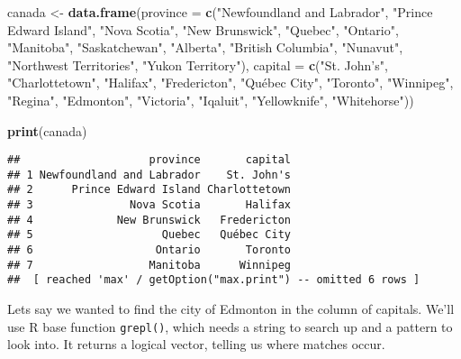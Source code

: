 \documentclass[
]{book}
\newenvironment{Shaded}{\begin{snugshade}}{\end{snugshade}}
\newcommand{\DataTypeTok}[1]{\textcolor[rgb]{0.13,0.29,0.53}{#1}}
\newcommand{\KeywordTok}[1]{\textcolor[rgb]{0.13,0.29,0.53}{\textbf{#1}}}
\newcommand{\NormalTok}[1]{#1}
\newcommand{\OperatorTok}[1]{\textcolor[rgb]{0.81,0.36,0.00}{\textbf{#1}}}
\newcommand{\StringTok}[1]{\textcolor[rgb]{0.31,0.60,0.02}{#1}}
\begin{document}
\begin{Shaded}
\begin{Highlighting}[]
\NormalTok{canada <-}\StringTok{ }\KeywordTok{data.frame}\NormalTok{(}\DataTypeTok{province =} \KeywordTok{c}\NormalTok{(}\StringTok{"Newfoundland and Labrador"}\NormalTok{, }\StringTok{"Prince Edward Island"}\NormalTok{, }\StringTok{"Nova Scotia"}\NormalTok{, }\StringTok{"New Brunswick"}\NormalTok{, }\StringTok{"Quebec"}\NormalTok{, }\StringTok{"Ontario"}\NormalTok{, }\StringTok{"Manitoba"}\NormalTok{, }\StringTok{"Saskatchewan"}\NormalTok{, }\StringTok{"Alberta"}\NormalTok{, }\StringTok{"British Columbia"}\NormalTok{, }\StringTok{"Nunavut"}\NormalTok{, }\StringTok{"Northwest Territories"}\NormalTok{, }\StringTok{"Yukon Territory"}\NormalTok{),}
                     \DataTypeTok{capital =} \KeywordTok{c}\NormalTok{(}\StringTok{"St. John's"}\NormalTok{, }\StringTok{"Charlottetown"}\NormalTok{, }\StringTok{"Halifax"}\NormalTok{, }\StringTok{"Fredericton"}\NormalTok{, }\StringTok{"Québec City"}\NormalTok{, }\StringTok{"Toronto"}\NormalTok{, }\StringTok{"Winnipeg"}\NormalTok{, }\StringTok{"Regina"}\NormalTok{, }\StringTok{"Edmonton"}\NormalTok{, }\StringTok{"Victoria"}\NormalTok{, }\StringTok{"Iqaluit"}\NormalTok{, }\StringTok{"Yellowknife"}\NormalTok{, }\StringTok{"Whitehorse"}\NormalTok{))}

\KeywordTok{print}\NormalTok{(canada)}
\end{Highlighting}
\end{Shaded}

\begin{verbatim}
##                    province       capital
## 1 Newfoundland and Labrador    St. John's
## 2      Prince Edward Island Charlottetown
## 3               Nova Scotia       Halifax
## 4             New Brunswick   Fredericton
## 5                    Quebec   Québec City
## 6                   Ontario       Toronto
## 7                  Manitoba      Winnipeg
##  [ reached 'max' / getOption("max.print") -- omitted 6 rows ]
\end{verbatim}

Lets say we wanted to find the city of Edmonton in the column of capitals. We'll use R base function \texttt{grepl()}, which needs a string to search up and a pattern to look into. It returns a logical vector, telling us where matches occur.

\begin{Shaded}
\end{Shaded}
\end{document}
